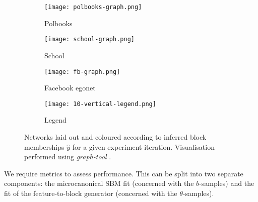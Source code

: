 \begin{figure}[!h]
	\centering
	\begin{subfigure}[t]{0.28\linewidth}
		\centering
		\texttt{[image: polbooks-graph.png]}
		\caption{Polbooks}
		\label{fig:polbooks-graph}
	\end{subfigure}
	\hfill
	\begin{subfigure}[t]{0.28\linewidth}
		\centering
		\texttt{[image: school-graph.png]}
		\caption{School}
		\label{fig:school-graph}
	\end{subfigure}
	\hfill
	\begin{subfigure}[t]{0.28\linewidth}
		\centering
		\texttt{[image: fb-graph.png]}
		\caption{Facebook egonet}
		\label{fig:fb-graph}
	\end{subfigure}
	\begin{subfigure}[t]{0.11\linewidth}
		\centering
		\texttt{[image: 10-vertical-legend.png]}
		\caption{Legend}
		\label{fig:10-legend}
	\end{subfigure}
	\caption{Networks laid out and coloured according to inferred block memberships $\hat{y}$ for a given experiment iteration. Visualisation performed using \textit{graph-tool} \cite{peixoto_graph-tool_2014}.}
	\label{fig:graphs-all}
\end{figure}
\begin{table}[!h]
	\centering
	\caption{Experimental results averaged over $n=10$ iterations (mean $\pm$ standard deviation).}
	\label{tab:results}
\end{table}
%
We require metrics to assess performance. This can be split into two separate 
components: the microcanonical SBM fit (concerned with the $b$-samples) and 
the fit of the feature-to-block generator (concerned with the $\theta$-samples). 

